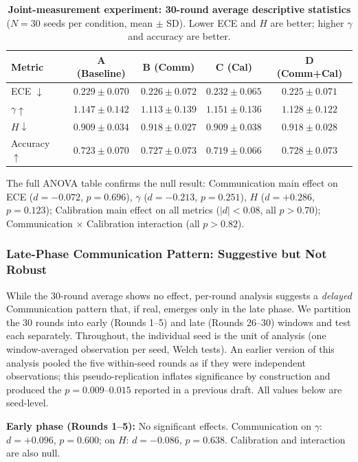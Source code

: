 \documentclass[11pt]{article}
\theoremstyle{definition}
\theoremstyle{remark}
\begin{document}
\begin{table}[H]
\centering
\caption{\textbf{Joint-measurement experiment: 30-round average descriptive statistics} ($N{=}30$ seeds per condition, mean $\pm$ SD). Lower ECE and $H$ are better; higher $\gamma$ and accuracy are better.}
\label{tab:joint_overall}
\begin{tabular}{@{}lcccc@{}}
\toprule
Metric & A (Baseline) & B (Comm) & C (Cal) & D (Comm+Cal) \\
\midrule
ECE $\downarrow$ & $0.229 \pm 0.070$ & $0.226 \pm 0.072$ & $0.232 \pm 0.065$ & $0.225 \pm 0.071$ \\
$\gamma \uparrow$ & $1.147 \pm 0.142$ & $1.113 \pm 0.139$ & $1.151 \pm 0.136$ & $1.128 \pm 0.122$ \\
$H \downarrow$ & $0.909 \pm 0.034$ & $0.918 \pm 0.027$ & $0.909 \pm 0.038$ & $0.918 \pm 0.028$ \\
Accuracy $\uparrow$ & $0.723 \pm 0.070$ & $0.727 \pm 0.073$ & $0.719 \pm 0.066$ & $0.728 \pm 0.073$ \\
\bottomrule
\end{tabular}
\end{table}

The full ANOVA table confirms the null result: Communication main effect on ECE ($d{=}-0.072$, $p{=}0.696$), $\gamma$ ($d{=}-0.213$, $p{=}0.251$), $H$ ($d{=}+0.286$, $p{=}0.123$); Calibration main effect on all metrics ($|d| < 0.08$, all $p > 0.70$); Communication $\times$ Calibration interaction (all $p > 0.82$).

\subsubsection{Late-Phase Communication Pattern: Suggestive but Not Robust}

While the 30-round average shows no effect, per-round analysis suggests a \textit{delayed} Communication pattern that, if real, emerges only in the late phase. We partition the 30 rounds into early (Rounds 1--5) and late (Rounds 26--30) windows and test each separately. Throughout, the individual seed is the unit of analysis (one window-averaged observation per seed, Welch tests). An earlier version of this analysis pooled the five within-seed rounds as if they were independent observations; this pseudo-replication inflates significance by construction and produced the $p {=} 0.009$--$0.015$ reported in a previous draft. All values below are seed-level.

\textbf{Early phase (Rounds 1--5):} No significant effects. Communication on $\gamma$: $d{=}+0.096$, $p{=}0.600$; on $H$: $d{=}-0.086$, $p{=}0.638$. Calibration and interaction are also null.
\end{document}
